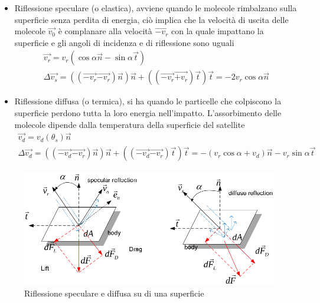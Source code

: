 \begin{itemize}
  \item Riflessione speculare (o elastica), avviene quando le molecole
  rimbalzano sulla superficie senza perdita di energia, ciò implica che la
  velocità di uscita delle molecole $\vec{v_0}$ è complanare alla velocità
  $\vec{-v_r}$ con la quale impattano la superficie e gli angoli di incidenza e
  di riflessione sono uguali
\begin{equation}
\begin{array}{l}
\vec{v_r}=v_r(\cos{\alpha \vec{n}}-\sin{\alpha \vec{t}}) \\
\Delta \vec{v_s}=((\vec{-v_r}\vec{-v_r})\vec{n})\vec{n} +
((\vec{-v_r}\vec{+v_r})\vec{t})\vec{t} = -2v_r\cos{\alpha \vec{n}}
\end{array}
\label{eq:specular}
\end{equation}
  \item Riflessione diffusa (o termica), si ha quando le particelle che
  colpiscono la superficie perdono tutta la loro energia nell'impatto.
  L'assorbimento delle molecole dipende dalla temperatura della superficie del
  satellite
\begin{equation}
\begin{array}{l}
\vec{v_d}=v_d(\theta_s)\vec{n} \\
\Delta\vec{v_d}=((\vec{-v_d}\vec{-v_r})\vec{n})\vec{n} +
((\vec{-v_d}\vec{-v_r})\vec{t})\vec{t}
= -(v_r\cos{\alpha}+v_d)\vec{n}-v_r\sin{\alpha}\vec{t}
\end{array}
\label{eq:diffusion}
\end{equation}
\end{itemize}

\begin{figure}[htp]
\begin{center}
  \includegraphics[width=\textwidth]{modelling/orbit_dynamics/image/riflessione.png}
  \caption{Riflessione speculare e diffusa su di una superficie}
  \label{fig:riflessione}
\end{center}
\end{figure}

